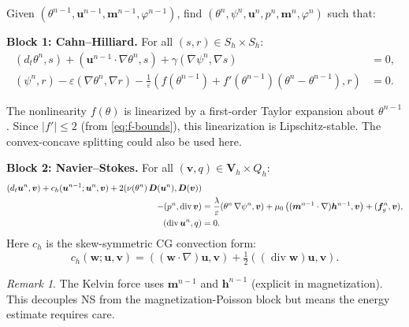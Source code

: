 \documentclass[11pt,a4paper]{article}
\theoremstyle{definition}
\theoremstyle{remark}
\newtheorem{remark}[proposition]{Remark}
\newcommand{\dv}{\operatorname{div}}
\newcommand{\grad}{\nabla}
\newcommand{\eps}{\varepsilon}
\newcommand{\half}{\tfrac{1}{2}}
\newcommand{\bfu}{\bm{u}}
\newcommand{\bfm}{\bm{m}}
\newcommand{\bfh}{\bm{h}}
\newcommand{\bff}{\bm{f}}
\newcommand{\bfv}{\bm{v}}
\newcommand{\bfV}{\bm{V}}
\begin{document}
Given $(\theta^{n-1}, \bfu^{n-1}, \bfm^{n-1}, \varphi^{n-1})$, find
$(\theta^n, \psi^n, \bfu^n, p^n, \bfm^n, \varphi^n)$ such that:

\bigskip
\noindent\textbf{Block 1: Cahn--Hilliard.}
For all $(s, r) \in S_h \times S_h$:
\begin{subequations}
\label{eq:disc-CH}
\begin{align}
  (d_t\theta^n, s)
  + (\bfu^{n-1}\cdot\grad\theta^n, s)
  + \gamma(\grad\psi^n, \grad s)
  &= 0,
  \label{eq:disc-CH-a} \\
  (\psi^n, r) - \eps(\grad\theta^n, \grad r)
  - \frac{1}{\eps}\left(f(\theta^{n-1}) + f'(\theta^{n-1})(\theta^n - \theta^{n-1}), r\right)
  &= 0.
  \label{eq:disc-CH-b}
\end{align}
\end{subequations}

\begin{derivnote}
The nonlinearity $f(\theta)$ is linearized by a first-order Taylor
expansion about $\theta^{n-1}$. Since $|f'| \leq 2$
(from \eqref{eq:f-bounds}), this linearization is Lipschitz-stable.
The convex-concave splitting could also be used here.
\end{derivnote}

\bigskip
\noindent\textbf{Block 2: Navier--Stokes.}
For all $(\bfv, q) \in \bfV{}_h \times Q_h$:
\begin{subequations}
\label{eq:disc-NS}
\begin{align}
  (d_t\bfu^n, \bfv)
  + c_h(\bfu^{n-1}; \bfu^n, \bfv)
  + 2(\nu(\theta^n)\,\bm{D}(\bfu^n), \bm{D}(\bfv))
  &\notag\\
  - (p^n, \dv\bfv)
  &= \frac{\lambda}{\eps}(\theta^n\,\grad\psi^n, \bfv)
     + \mu_0\left((\bfm^{n-1}\cdot\grad)\bfh^{n-1}, \bfv\right)
     + (\bff_g^n, \bfv),
  \label{eq:disc-NS-a} \\
  (\dv\bfu^n, q) &= 0.
  \label{eq:disc-NS-b}
\end{align}
\end{subequations}
Here $c_h$ is the skew-symmetric CG convection form:
\begin{equation}
  \label{eq:cg-convection}
  c_h(\bm{w}; \bfu, \bfv) = ((\bm{w}\cdot\grad)\bfu, \bfv)
  + \half((\dv\bm{w})\bfu, \bfv).
\end{equation}

\begin{remark}
  The Kelvin force uses $\bfm^{n-1}$ and $\bfh^{n-1}$ (explicit in
  magnetization). This decouples NS from the magnetization-Poisson
  block but means the energy estimate requires care.
\end{remark}
\end{document}
